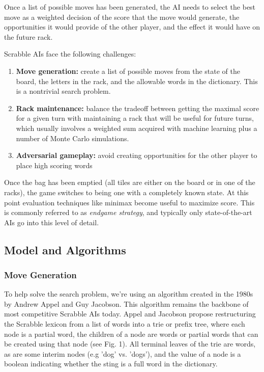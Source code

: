 \documentclass[12pt]{article}
\begin{document}
Once a list of possible moves has been generated, the AI needs to
select the best move as a weighted decision of the score that the move
would generate, the opportunities it would provide of the other
player, and the effect it would have on the future rack.

Scrabble AIs face the following challenges:
\begin{enumerate}
  \item \textbf{Move generation:} create a list of possible moves from
    the state of the board, the letters in the rack, and the allowable
    words in the dictionary. This is a nontrivial search problem.
    
  \item \textbf{Rack maintenance:} balance the tradeoff between getting
    the maximal score for a given turn with maintaining a rack that
    will be useful for future turns, which usually involves a weighted
    sum acquired with machine learning plus a number of Monte Carlo
    simulations.
    
  \item \textbf{Adversarial gameplay:} avoid creating opportunities
    for the other player to place high scoring words 
\end{enumerate}

Once the bag has been emptied (all tiles are either on the board or in
one of the racks), the game switches to being one with a completely
known state. At this point evaluation techniques like minimax become
useful to maximize score. This is commonly referred to as
\emph{endgame strategy}, and typically only state-of-the-art AIs go
into this level of detail.

\subsection*{Model and Algorithms}
\subsubsection*{Move Generation}
To help solve the search problem, we're using an algorithm created in
the 1980s by Andrew Appel and Guy Jacobson. This algorithm remains the
backbone of most competitive Scrabble AIs today. Appel and
Jacobson propose restructuring the Scrabble lexicon from a list of
words into a trie or prefix tree, where each node is a partial word,
the children of a node are words or partial words that can be created
using that node (see Fig. 1). All terminal leaves of the trie are
words, as are some interim nodes (e.g 'dog' vs. 'dogs'), and the value
of a node is a boolean indicating whether the sting is a full word in
the dictionary.
\end{document}
